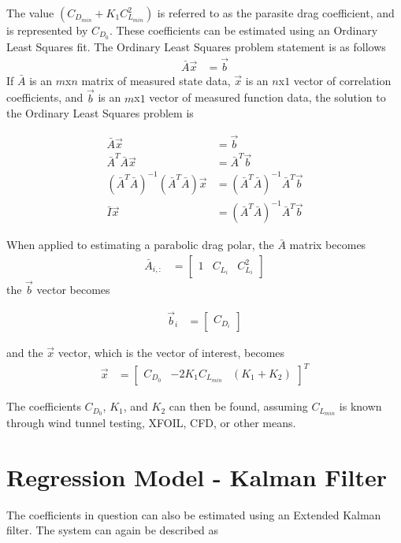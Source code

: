 The value $(C_{D_{min}}+K_1C^2_{L_{min}})$ is referred to as the parasite drag coefficient, and is represented by $C_{D_0}$\cite{raymer}.
These coefficients can be estimated using an Ordinary Least Squares fit. The Ordinary Least Squares problem statement is as follows
\begin{align}
\bar{A}\vec{x} &= \vec{b}
\end{align}
If $\bar{A}$ is an $m$x$n$ matrix of measured state data, $\vec{x}$ is an $n$x$1$ vector of correlation coefficients, and $\vec{b}$ is an $m$x$1$ vector of measured function data, the solution to the Ordinary Least Squares problem is 

\begin{align}
\bar{A}\vec{x}&=\vec{b}\\
\bar{A}^T\bar{A}\vec{x} &= \bar{A}^T\vec{b}\\
(\bar{A}^T\bar{A})^{-1}(\bar{A}^T \bar{A})\vec{x} &= (\bar{A}^T\bar{A})^{-1}\bar{A}^T\vec{b}\\
\bar{I}\vec{x} &=(\bar{A}^T\bar{A})^{-1}\bar{A}^T\vec{b}
\end{align}

When applied to estimating a parabolic drag polar, the $\bar{A}$ matrix becomes
\begin{align}
\bar{A}_{i,:} &= 
\begin{bmatrix}
1 & C_{L_i} & C^2_{L_i}
\end{bmatrix}
\end{align}
the $\vec{b}$ vector becomes

\begin{align}
\vec{b}_i &=
\begin{bmatrix}
C_{D_i}
\end{bmatrix}
\end{align}

and the $\vec{x}$ vector, which is the vector of interest, becomes
\begin{align}
\vec{x} &=
\begin{bmatrix}
C_{D_0} & -2K_1C_{L_{min}} & (K_1+K_2)
\end{bmatrix}^T
\end{align}

The coefficients $C_{D_0}$, $K_1$, and $K_2$ can then be found, assuming $C_{L_{min}}$ is known through wind tunnel testing, XFOIL, CFD, or other means.

\section{Regression Model - Kalman Filter}
The coefficients in question can also be estimated using an Extended Kalman filter. The system can again be described as 

